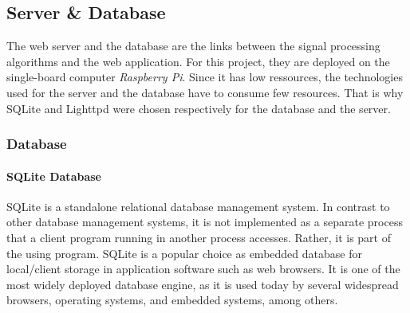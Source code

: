 \subsection{Server \& Database}

%
%
%
%

The web server and the database are the links between the signal processing algorithms and the web application. For this project, they are deployed on the single-board computer \textit{Raspberry Pi}. Since it has low ressources, the technologies used for the server and the database have to consume few resources. That is why SQLite and Lighttpd were chosen respectively for the database and the server.

\subsubsection{Database}

    \paragraph{SQLite Database}
    
    SQLite is a standalone relational database management system. In contrast to other database management systems, it is not implemented as a separate process that a client program running in another process accesses. Rather, it is part of the using program. SQLite is a popular choice as embedded database for local/client storage in application software such as web browsers. It is one of the most widely deployed database engine, as it is used today by several widespread browsers, operating systems, and embedded systems, among others. 
    
